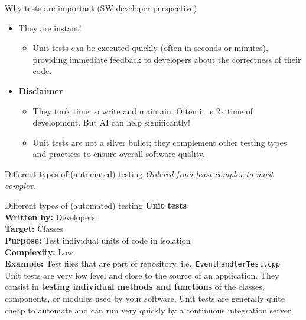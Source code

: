 \documentclass[
  ignorenonframetext,
  american,
  t,
  aspectratio=169]{beamer}
\providecommand{\tightlist}{%
  \setlength{\itemsep}{0pt}\setlength{\parskip}{0pt}}
\begin{document}
\begin{frame}{Why tests are important (SW developer perspective)}
\protect{}\label{why-tests-are-important-sw-developer-perspective-1}
\begin{itemize}
\tightlist
\item
  They are instant!

  \begin{itemize}
  \tightlist
  \item
    Unit tests can be executed quickly (often in seconds or minutes),
    providing immediate feedback to developers about the correctness of
    their code.
  \end{itemize}
\item
  \textbf{Disclaimer}

  \begin{itemize}
  \tightlist
  \item
    They took time to write and maintain. Often it is 2x time of
    development. But AI can help significantly!
  \item
    Unit tests are not a silver bullet; they complement other testing
    types and practices to ensure overall software quality.
  \end{itemize}
\end{itemize}
\end{frame}

\begin{frame}{Different types of (automated) testing}
\protect{}\label{different-types-of-automated-testing}
\emph{Ordered from least complex to most complex}.
\end{frame}

\begin{frame}[fragile]{Different types of (automated) testing}
\protect{}\label{different-types-of-automated-testing-1}
\textbf{Unit tests}\\
\textbf{Written by:} Developers\\
\textbf{Target:} Classes\\
\textbf{Purpose:} Test individual units of code in isolation\\
\textbf{Complexity:} Low\\
\textbf{Example:} Test files that are part of repository,
i.e.~\texttt{EventHandlerTest.cpp}\\
Unit tests are very low level and close to the source of an application.
They consist in \textbf{testing individual methods and functions} of the
classes, components, or modules used by your software. Unit tests are
generally quite cheap to automate and can run very quickly by a
continuous integration server.
\end{frame}
\end{document}
